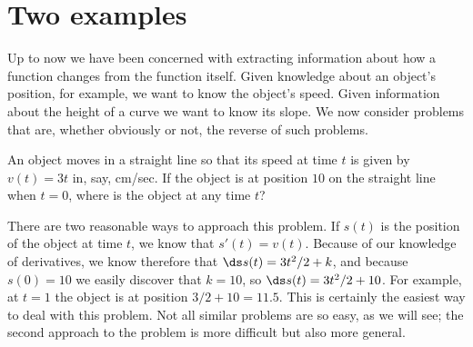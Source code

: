 \section{Two examples}{}{}
\nobreak
Up to now we have been concerned with extracting information about how
a function changes from the function itself. Given knowledge about an
object's position, for example, we want to know the object's
speed. Given information about the height of a curve we want to know
its slope. We now consider problems that are, whether obviously or
not, the reverse of such problems.

\begin{example}
An object moves in a straight line so that
its speed at time $t$ is given by $v(t)=3t$ in, say, cm/sec. If the
object is at position $10$ on the straight line when $t=0$, where is
the object at any time $t$? 

There are two reasonable ways to approach this problem. If $s(t)$ is
the position of the object at time $t$, we know that
$s'(t)=v(t)$. Because of our knowledge of derivatives, we know
therefore that $\ds s(t)=3t^2/2+k$, and because $s(0)=10$ we easily
discover that $k=10$, so $\ds s(t)=3t^2/2+10$. For example, at $t=1$ the
object is at position $3/2+10=11.5$.
This is certainly the easiest way to deal with this problem. Not all
similar problems are so easy, as we will see; the second approach to
the problem is more difficult but also more general.


\end{example}
